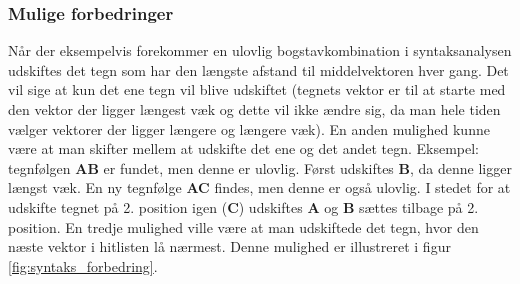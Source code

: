 \subsubsection{Mulige forbedringer}


Når der eksempelvis forekommer en ulovlig bogstavkombination i syntaksanalysen udskiftes det tegn som har den længste afstand til middelvektoren hver gang. Det vil sige at kun det ene tegn vil blive udskiftet (tegnets vektor er til at starte med den vektor der ligger længest væk og dette vil ikke ændre sig, da man hele tiden vælger vektorer der ligger længere og længere væk). En anden mulighed kunne være at man skifter mellem at udskifte det ene og det andet tegn. Eksempel: tegnfølgen \textbf{AB} er fundet, men denne er ulovlig. Først udskiftes \textbf{B}, da denne ligger længst væk. En ny tegnfølge \textbf{AC} findes, men denne er også ulovlig. I stedet for at udskifte tegnet på 2. position igen (\textbf{C}) udskiftes \textbf{A} og \textbf{B} sættes tilbage på 2. position. En tredje mulighed ville være at man udskiftede det tegn, hvor den næste vektor i hitlisten lå nærmest. Denne mulighed er illustreret i figur \vref{fig:syntaks_forbedring}.


